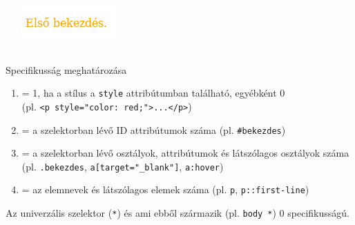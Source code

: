 \begin{frame}
  \begin{exampleblock}{}
    \scriptsize
    
  \end{exampleblock}
  \begin{columns}[T]
      \begin{exampleblock}{}
        \scriptsize
        
      \end{exampleblock}
      \includegraphics[width=.66\textwidth]{utkozes2.png}
  \end{columns} 
\end{frame}

\begin{frame}
  Specifikusság meghatározása
  \begin{enumerate}
    \renewcommand{\theenumi}{\Alph{enumi}}
    \item = 1, ha a stílus a \texttt{style} attribútumban található, egyébként 0\\(pl. \texttt{<p style="color: red;">...</p>})
    \item = a szelektorban lévő ID attribútumok száma (pl. \texttt{\#bekezdes})
    \item = a szelektorban lévő osztályok, attribútumok és látszólagos osztályok száma\\(pl. \texttt{.bekezdes}, \texttt{a[target="\_blank"]}, \texttt{a:hover})
    \item = az elemnevek és látszólagos elemek száma (pl. \texttt{p}, \texttt{p::first-line})
  \end{enumerate}
  Az univerzális szelektor (\texttt{*}) és ami ebből származik (pl. \texttt{body *}) 0 specifikusságú.
\end{frame}

